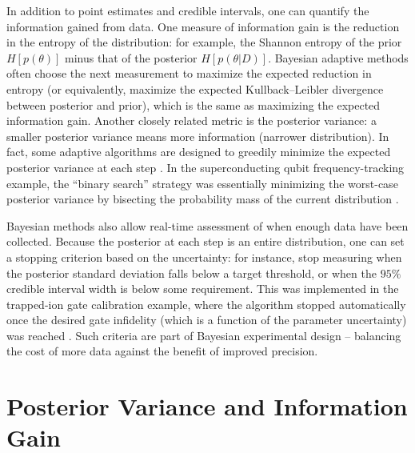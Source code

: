 In addition to point estimates and credible intervals, one can
quantify the information gained from data. One measure of information
gain is the reduction in the entropy of the distribution: for example,
the Shannon entropy of the prior $H[p(\theta)]$ minus that of the
posterior $H[p(\theta|D)]$. Bayesian adaptive methods often choose the
next measurement to maximize the expected reduction in entropy (or
equivalently, maximize the expected Kullback–Leibler divergence
between posterior and prior), which is the same as maximizing the
expected information gain. Another closely related metric is the
posterior variance: a smaller posterior variance means more
information (narrower distribution). In fact, some adaptive algorithms
are designed to greedily minimize the expected posterior variance at
each step . In the superconducting qubit frequency-tracking example,
the “binary search” strategy was essentially minimizing the worst-case
posterior variance by bisecting the probability mass of the current
distribution .



Bayesian methods also allow real-time assessment of when enough data
have been collected. Because the posterior at each step is an entire
distribution, one can set a stopping criterion based on the
uncertainty: for instance, stop measuring when the posterior standard
deviation falls below a target threshold, or when the $95\%$ credible
interval width is below some requirement. This was implemented in the
trapped-ion gate calibration example, where the algorithm stopped
automatically once the desired gate infidelity (which is a function of
the parameter uncertainty) was reached . Such criteria are part of
Bayesian experimental design – balancing the cost of more data against
the benefit of improved precision.



\section{Posterior Variance and Information Gain}

